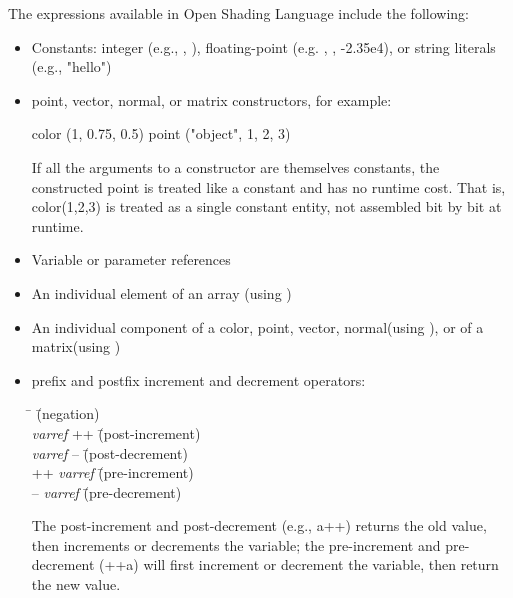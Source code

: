 \documentclass[11pt,letterpaper]{book}
\def\langname{Open Shading Language\xspace}
\def\color{{\cf color}\xspace}
\def\matrix{{\cf matrix}\xspace}
\def\normal{{\cf normal}\xspace}
\def\point{{\cf point}\xspace}
\def\vector{{\cf vector}\xspace}
\begin{document}
The expressions available in \langname include the following:

\begin{itemize}
\item Constants: integer (e.g., {}, {}), floating-point
  (e.g. {}, {}, {\cf -2.35e4}), or string literals (e.g., {\cf
  "hello"})

\item point, vector, normal, or matrix constructors, for example:

\begin{code}
    color (1, 0.75, 0.5)
    point ("object", 1, 2, 3)
\end{code}

If all the arguments to a constructor are themselves constants, the
constructed point is treated like a constant and has no runtime cost.
That is, {\cf color(1,2,3)} is treated as a single constant entity, not
assembled bit by bit at runtime.

\item Variable or parameter references

\item An individual element of an array (using {\cf [ ] })

\item An individual component of a \color,
\point, \vector, \normal (using {\cf [ ]}), 
or of a \matrix (using {\cf [][]})

\item prefix and postfix increment and decrement operators:

\begin{tabbing}
\hspace{.25in} \= \hspace{2in} \= (negation) \kill \\
\> \emph{varref} {\cf ++} \hspace{1in} \= (post-increment) \\
\> \emph{varref} {\cf --}  \hspace{1in} \= (post-decrement) \\
\> {\cf ++} \emph{varref} \hspace{1in} \= (pre-increment) \\
\> {\cf --} \emph{varref} \hspace{1in} \= (pre-decrement) \\
\end{tabbing}

The post-increment and post-decrement (e.g., {\cf a++}) returns the old
value, then increments or decrements the variable; the pre-increment and
pre-decrement ({\cf ++a}) will first increment or decrement the
variable, then return the new value.


\end{itemize}
\end{document}
